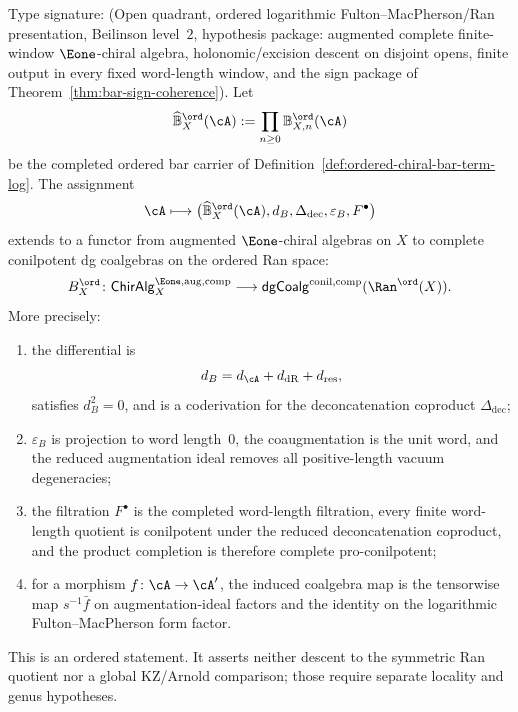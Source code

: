 \begin{theorem}
\label{thm:ordered-bar-complete-conilpotent-functor}
Type signature: \textup{(}Open quadrant, ordered logarithmic
Fulton--MacPherson/Ran presentation, Beilinson level~$2$, hypothesis
package: augmented complete finite-window $\Eone$-chiral algebra,
holonomic/excision descent on disjoint opens, finite output in every
fixed word-length window, and the sign package of
Theorem~\ref{thm:bar-sign-coherence}\textup{)}.
Let
\[
\widehat{\mathbb B}^{\ord}_X(\cA)
        :=\prod_{n\geq 0}\mathbb B^{\ord}_{X,n}(\cA)
\]
be the completed ordered bar carrier of
Definition~\ref{def:ordered-chiral-bar-term-log}. The assignment
\[
\cA\longmapsto
\bigl(\widehat{\mathbb B}_X^{\ord}(\cA),d_B,\Delta_{\mathrm{dec}},
\varepsilon_B,F^\bullet\bigr)
\]
extends to a functor from augmented $\Eone$-chiral algebras on $X$ to
complete conilpotent dg coalgebras on the ordered Ran space:
\[
B_X^{\ord}\colon
\mathsf{ChirAlg}^{\Eone,\mathrm{aug,comp}}_X
\longrightarrow
\mathsf{dgCoalg}^{\mathrm{conil,comp}}(\Ran^{\ord}(X)).
\]
More precisely:
\begin{enumerate}
\item the differential is
\[
d_B=d_\cA+d_{\mathrm{dR}}+d_{\mathrm{res}},
\]
satisfies \(d_B^2=0\), and is a coderivation for the
deconcatenation coproduct \(\Delta_{\mathrm{dec}}\);
\item \(\varepsilon_B\) is projection to word length~\(0\), the
coaugmentation is the unit word, and the reduced augmentation ideal
removes all positive-length vacuum degeneracies;
\item the filtration \(F^\bullet\) is the completed word-length
filtration, every finite word-length quotient is conilpotent under
the reduced deconcatenation coproduct, and the product completion is
therefore complete pro-conilpotent;
\item for a morphism \(f\colon\cA\to\cA'\), the induced coalgebra map is
the tensorwise map \(s^{-1}\bar f\) on augmentation-ideal factors and
the identity on the logarithmic Fulton--MacPherson form factor.
\end{enumerate}
This is an ordered statement. It asserts neither descent to the
symmetric Ran quotient nor a global KZ/Arnold comparison; those require
separate locality and genus hypotheses.
\end{theorem}

